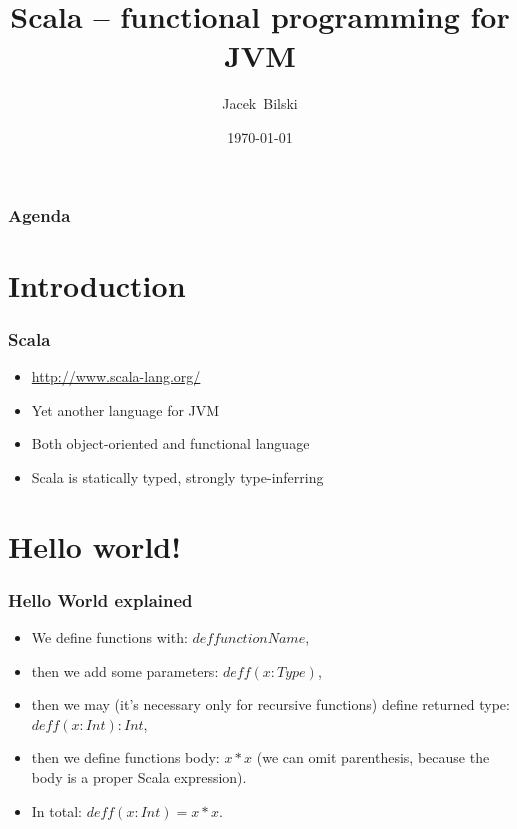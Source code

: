 \documentclass[xcolor=dvipsnames]{beamer}
\title{Scala -- functional programming for JVM}
\author{Jacek~Bilski}
\date{\today}
\begin{document}
\begin{frame}
\titlepage
\end{frame}

\begin{frame}
\frametitle{Agenda}
\tableofcontents[pausesections]
\end{frame}

\section{Introduction}

\begin{frame}
\frametitle{Scala}
\begin{itemize}
\item \href{http://www.scala-lang.org/}{http://www.scala-lang.org/}
\item Yet another language for JVM
\item Both object-oriented and functional language
\item Scala is statically typed, strongly type-inferring
\end{itemize}
\end{frame}

\section{Hello world!}


\begin{frame}
\frametitle{Hello World explained}
\begin{itemize}
\item We define functions with: $def functionName$,
\item then we add some parameters: $def f(x: Type)$,
\item then we may (it's necessary only for recursive functions) define returned type: $def f(x: Int): Int$,
\item then we define functions body: $x * x$ (we can omit parenthesis, because the body is a proper Scala expression).
\item In total: $def f(x: Int) = x * x$.
\end{itemize}
\end{frame}
\end{document}
